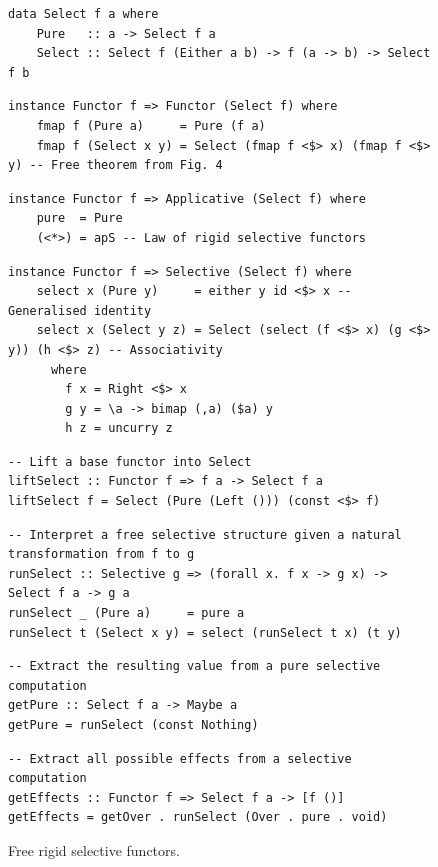 \begin{figure}
\begin{verbatim}
data Select f a where
    Pure   :: a -> Select f a
    Select :: Select f (Either a b) -> f (a -> b) -> Select f b
\end{verbatim}
\vspace{1mm}
\begin{verbatim}
instance Functor f => Functor (Select f) where
    fmap f (Pure a)     = Pure (f a)
    fmap f (Select x y) = Select (fmap f <$> x) (fmap f <$> y) -- Free theorem from Fig. 4
\end{verbatim}
\vspace{1mm}
\begin{verbatim}
instance Functor f => Applicative (Select f) where
    pure  = Pure
    (<*>) = apS -- Law of rigid selective functors
\end{verbatim}
\vspace{1mm}
\begin{verbatim}
instance Functor f => Selective (Select f) where
    select x (Pure y)     = either y id <$> x -- Generalised identity
    select x (Select y z) = Select (select (f <$> x) (g <$> y)) (h <$> z) -- Associativity
      where
        f x = Right <$> x
        g y = \a -> bimap (,a) ($a) y
        h z = uncurry z
\end{verbatim}
\vspace{1mm}
\begin{verbatim}
-- Lift a base functor into Select
liftSelect :: Functor f => f a -> Select f a
liftSelect f = Select (Pure (Left ())) (const <$> f)
\end{verbatim}
\vspace{1mm}
\begin{verbatim}
-- Interpret a free selective structure given a natural transformation from f to g
runSelect :: Selective g => (forall x. f x -> g x) -> Select f a -> g a
runSelect _ (Pure a)     = pure a
runSelect t (Select x y) = select (runSelect t x) (t y)
\end{verbatim}
\vspace{1mm}
\begin{verbatim}
-- Extract the resulting value from a pure selective computation
getPure :: Select f a -> Maybe a
getPure = runSelect (const Nothing)
\end{verbatim}
\vspace{1mm}
\begin{verbatim}
-- Extract all possible effects from a selective computation
getEffects :: Functor f => Select f a -> [f ()]
getEffects = getOver . runSelect (Over . pure . void)
\end{verbatim}
\vspace{-1mm}
\caption{Free rigid selective functors.}\label{fig-free}
\vspace{-4mm}
\end{figure}

